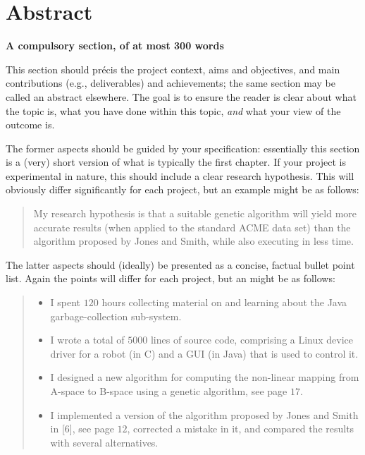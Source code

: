 \documentclass[ oneside,%
                    author={Joshua Felmeden},
                    degree={MEng},
                     title={Semantic Analysis of Financial Headlines Based on Realised Stock Returns},
                  subtitle={}]{dissertation}
\begin{document}
\frontmatter





\chapter*{Abstract}

{\bf A compulsory section, of at most 300 words} 
\vspace{1cm} 

\noindent
This section should pr\'{e}cis the project context, aims and objectives,
and main contributions (e.g., deliverables) and achievements; the same 
section may be called an abstract elsewhere.  The goal is to ensure the 
reader is clear about what the topic is, what you have done within this 
topic, {\em and} what your view of the outcome is.

The former aspects should be guided by your specification: essentially 
this section is a (very) short version of what is typically the first 
chapter. If your project is experimental in nature, this should include 
a clear research hypothesis.  This will obviously differ significantly
for each project, but an example might be as follows:

\begin{quote}
My research hypothesis is that a suitable genetic algorithm will yield
more accurate results (when applied to the standard ACME data set) than 
the algorithm proposed by Jones and Smith, while also executing in less
time.
\end{quote}

\noindent
The latter aspects should (ideally) be presented as a concise, factual 
bullet point list.  Again the points will differ for each project, but 
an might be as follows:

\begin{quote}
\noindent
\begin{itemize}
\item I spent $120$ hours collecting material on and learning about the 
      Java garbage-collection sub-system. 
\item I wrote a total of $5000$ lines of source code, comprising a Linux 
      device driver for a robot (in C) and a GUI (in Java) that is 
      used to control it.
\item I designed a new algorithm for computing the non-linear mapping 
      from A-space to B-space using a genetic algorithm, see page $17$.
\item I implemented a version of the algorithm proposed by Jones and 
      Smith in [6], see page $12$, corrected a mistake in it, and 
      compared the results with several alternatives.
\end{itemize}
\end{quote}
\end{document}
